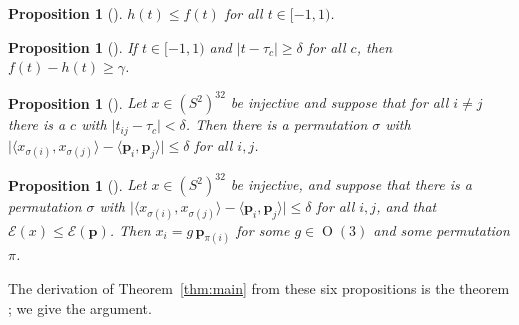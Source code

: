 \documentclass[11pt]{amsart}
\newtheorem{proposition}[theorem]{Proposition}
\theoremstyle{definition}
\theoremstyle{remark}
\newcommand{\Sph}{S^{2}}
\newcommand{\ip}[2]{\langle #1,#2\rangle}
\newcommand{\abs}[1]{\lvert #1\rvert}
\newcommand{\E}{\mathcal{E}}
\newcommand{\cand}{\mathbf{p}}
\DeclareMathOperator{\OO}{O}
\begin{document}
\begin{proposition}[]\label{prop:minorant}
$h(t)\le f(t)$ for all $t\in[-1,1)$.
\end{proposition}

\begin{proposition}[]\label{prop:gap}
If $t\in[-1,1)$ and $\abs{t-\tau_c}\ge\delta$ for all $c$, then $f(t)-h(t)\ge\gamma$.
\end{proposition}

\begin{proposition}[]\label{prop:windows}
Let $x\in(\Sph)^{32}$ be injective and suppose that for all $i\ne j$ there is a $c$ with $\abs{t_{ij}-\tau_c}<\delta$. Then there is a permutation $\sigma$ with $\abs{\ip{x_{\sigma(i)}}{x_{\sigma(j)}}-\ip{\cand_i}{\cand_j}}\le\delta$ for all $i,j$.
\end{proposition}

\begin{proposition}[]\label{prop:local}
Let $x\in(\Sph)^{32}$ be injective, and suppose that there is a permutation $\sigma$ with $\abs{\ip{x_{\sigma(i)}}{x_{\sigma(j)}}-\ip{\cand_i}{\cand_j}}\le\delta$ for all $i,j$, and that $\E(x)\le\E(\cand)$. Then $x_i=g\,\cand_{\pi(i)}$ for some $g\in\OO(3)$ and some permutation $\pi$.
\end{proposition}

The derivation of Theorem~\ref{thm:main} from these six propositions is the theorem ; we give the argument.
\end{document}
